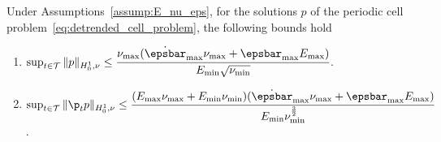 \documentclass[letterpaper,11pt]{article}
\begin{document}
\begin{proposition}\label{prop:periodic_bounds}
    Under Assumptions~\ref{assump:E_nu_eps}, for the solutions $p$ of the periodic cell problem~\eqref{eq:detrended_cell_problem}, the following bounds hold
    \begin{enumerate}[label=(\alph*)]
        \item $\sup_{t \in \mathcal{T}}\|p\|_{H_0^1, \nu} \leq \cfrac{\nu_{\max}(\dot{\epsbar}_{\max}\nu_{\max} + \epsbar_{\max}E_{\max})}{E_{\min}\sqrt{\nu_{\min}}}$.
        \item $\sup_{t \in \mathcal{T}}\|\p_tp\|_{H_0^1, \nu} \leq \cfrac{(E_{\max}\nu_{\max} + E_{\min}\nu_{\min})(\dot{\epsbar}_{\max}\nu_{\max} + \epsbar_{\max}E_{\max})}{E_{\min}\nu_{\min}^\frac{3}{2}}$.
    \end{enumerate}
\end{proposition}
\end{document}
